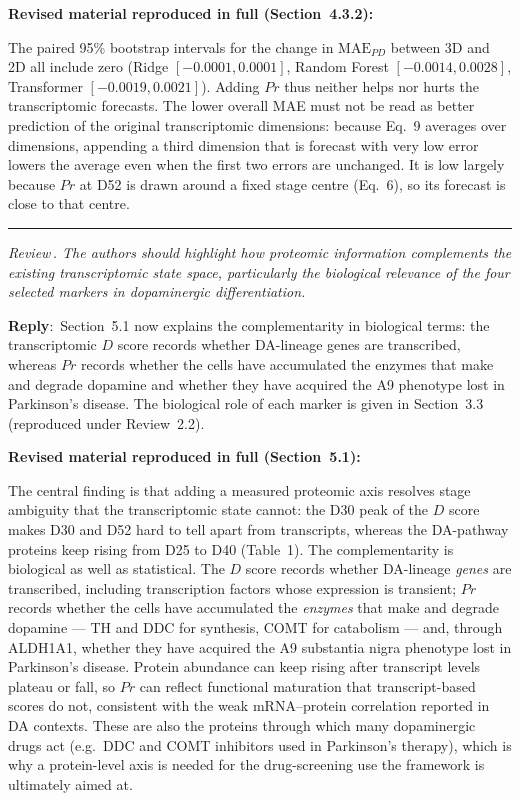 \documentclass[11pt]{article}
\newcounter{reviewer}
\newcounter{point}[reviewer]
\renewcommand{\thepoint}{Review\,\thereviewer.\arabic{point}}
\newcommand{\point}[1]{\refstepcounter{point}  \bigskip \hrule \medskip \noindent \textit{{\fontseries{b}\selectfont \thepoint } #1}\par}
\newcommand{\reply}{\medskip \noindent \textbf{Reply}:\ }
\newcommand{\revisedheading}[1]{\medskip\noindent\textbf{Revised material
  reproduced in full (#1):}\par}
\newenvironment{revised}{\par\color{red}}{\par}
\begin{document}
\revisedheading{Section~4.3.2}
\begin{revised}
The paired 95\% bootstrap intervals for the change in $\text{MAE}_{PD}$ between 3D and 2D all include zero (Ridge $[-0.0001, 0.0001]$, Random Forest $[-0.0014, 0.0028]$, Transformer $[-0.0019, 0.0021]$). Adding $Pr$ thus neither helps nor hurts the transcriptomic forecasts. The lower overall MAE must not be read as better prediction of the original transcriptomic dimensions: because Eq.~9 averages over dimensions, appending a third dimension that is forecast with very low error lowers the average even when the first two errors are unchanged. It is low largely because $Pr$ at D52 is drawn around a fixed stage centre (Eq.~6), so its forecast is close to that centre.
\end{revised}

\point{The authors should highlight how proteomic information complements the existing transcriptomic state space, particularly the biological relevance of the four selected markers in dopaminergic differentiation.}

\reply{Section~5.1 now explains the complementarity in biological terms: the transcriptomic $D$ score records whether DA-lineage genes are transcribed, whereas $Pr$ records whether the cells have accumulated the enzymes that make and degrade dopamine and whether they have acquired the A9 phenotype lost in Parkinson's disease. The biological role of each marker is given in Section~3.3 (reproduced under Review~2.2).}

\revisedheading{Section~5.1}
\begin{revised}
The central finding is that adding a measured proteomic axis resolves stage ambiguity that the transcriptomic state cannot: the D30 peak of the $D$ score makes D30 and D52 hard to tell apart from transcripts, whereas the DA-pathway proteins keep rising from D25 to D40 (Table~1). The complementarity is biological as well as statistical. The $D$ score records whether DA-lineage \textit{genes} are transcribed, including transcription factors whose expression is transient; $Pr$ records whether the cells have accumulated the \textit{enzymes} that make and degrade dopamine --- TH and DDC for synthesis, COMT for catabolism --- and, through ALDH1A1, whether they have acquired the A9 substantia nigra phenotype lost in Parkinson's disease. Protein abundance can keep rising after transcript levels plateau or fall, so $Pr$ can reflect functional maturation that transcript-based scores do not, consistent with the weak mRNA--protein correlation reported in DA contexts. These are also the proteins through which many dopaminergic drugs act (e.g.\ DDC and COMT inhibitors used in Parkinson's therapy), which is why a protein-level axis is needed for the drug-screening use the framework is ultimately aimed at.
\end{revised}
\end{document}
